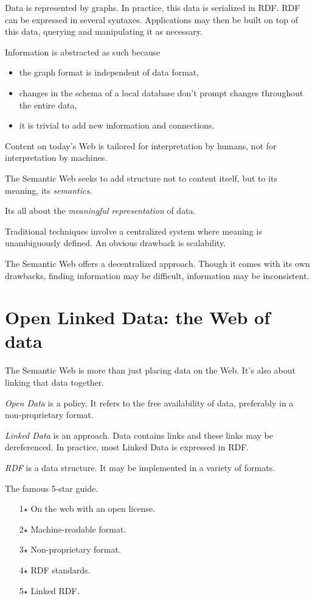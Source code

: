 \documentclass{report}
\begin{document}
Data is represented by graphs.
In practice, this data is serialized in RDF.
RDF can be expressed in several syntaxes.
Applications may then be built on top of this data,
querying and manipulating it as necessary.

Information is abstracted as such because
\begin{itemize}
  \item the graph format is independent of data format,
  \item changes in the schema of a local database
        don't prompt changes throughout the entire data,
  \item it is trivial to add new information and connections.
\end{itemize}

Content on today's Web is tailored 
for interpretation by humans,
not for interpretation by machines.

The Semantic Web seeks to add structure
not to content itself,
but to its meaning,
its \emph{semantics}.

Its all about the \emph{meaningful representation} of data.

Traditional techniques involve a centralized system
where meaning is unambiguously defined.
An obvious drawback is scalability.

The Semantic Web offers a decentralized approach.
Though it comes with its own drawbacks,
finding information may be difficult,
information may be inconsistent.

\section{Open Linked Data: the Web of data}

The Semantic Web is more than just placing data on the Web.
It's also about linking that data together.

\emph{Open Data} is a policy.
It refers to the free availability of data,
preferably in a non-proprietary format.

\emph{Linked Data} is an approach.
Data contains links
and these links may be dereferenced.
In practice, most Linked Data is expressed in RDF.

\emph{RDF} is a data structure.
It may be implemented in a variety of formats.

The famous 5-star guide.
\begin{enumerate}
  \item[1$\star$] On the web with an open license.
  \item[2$\star$] Machine-readable format. 
  \item[3$\star$] Non-proprietary format.
  \item[4$\star$] RDF standards.
  \item[5$\star$] Linked RDF.
\end{enumerate}
\end{document}
